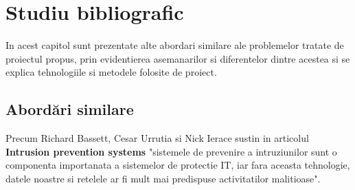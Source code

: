 
 \chapter{Studiu bibliografic}
\label{cap:studiu-bibliografic}
%
%
%
In acest capitol sunt prezentate alte abordari similare ale problemelor tratate de proiectul propus, prin evidentierea asemanarilor si diferentelor dintre acestea si se explica tehnologiile si metodele folosite de proiect.

 \section{Abordări similare}

%
%





Precum Richard Bassett, Cesar Urrutia si 	 Nick Ierace sustin in articolul \textbf{Intrusion prevention systems} \cite{ips} "sistemele de prevenire a intruziunilor sunt o componenta importanata a sistemelor de protectie IT, iar fara aceasta tehnologie, datele noastre si retelele ar fi mult mai predispuse activitatilor malitioase".

